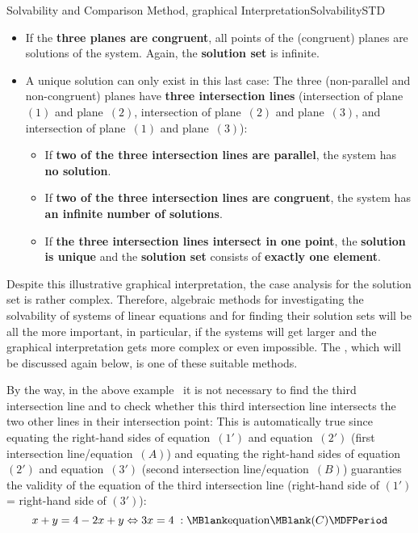 \begin{MXContent}{Solvability and Comparison Method, graphical Interpretation}{Solvability}{STD}
\begin{itemize}
{the third (non-parallel) plane is an \textbf{intersection line}. All points on this intersection
line are solutions of the system. Hence, the \textbf{solution set} is infinite.}
\item{If the \textbf{three planes are congruent}, all points of the (congruent) planes are 
solutions of the system. Again, the \textbf{solution set} is infinite.}
\item{A unique solution can only exist in this last case: The three (non-parallel and non-congruent)
planes have \textbf{three intersection lines} (intersection of plane~$(1)$ and plane~$(2)$, 
intersection of plane~$(2)$ and plane~$(3)$, and intersection of plane~$(1)$ and plane~$(3)$):
\begin{itemize}
\item{If \textbf{two of the three intersection lines are parallel}, the system has \textbf{no solution}.}
\item{If \textbf{two of the three intersection lines are congruent}, the system has 
\textbf{an infinite number of solutions}.}
\item{If \textbf{the three intersection lines intersect in one point}, the \textbf{solution is unique}
and the \textbf{solution set} consists of \textbf{exactly one element}.}
\end{itemize}}
\end{itemize}
Despite this illustrative graphical interpretation, the case analysis for the solution set is 
rather complex. Therefore, algebraic methods for investigating the solvability 
of systems of linear equations and for finding their solution sets will be all the more important, 
in particular, if the systems will get larger
and the graphical interpretation gets more complex or even impossible.
The , which will be discussed again below,
is one of these suitable methods.

By the way, in the above example~ it is not necessary to 
find the third intersection line and to check whether this third intersection line intersects
the two other lines in their intersection point: This is automatically true since 
equating the right-hand sides of equation~$(1')$ and equation~$(2')$  (first intersection
line/equation~$(A)$) and equating the right-hand sides of equation~$(2')$ and equation~$(3')$ 
(second intersection line/equation~$(B)$) guaranties the validity of the equation of 
the third intersection line (right-hand side of $(1')$ = right-hand side of $(3')$):
$$x + y = 4 - 2 x + y \Leftrightarrow 3 x = 4 \; : \MBlank\mbox{equation}\MBlank (C) \MDFPeriod $$


\end{MXContent}
